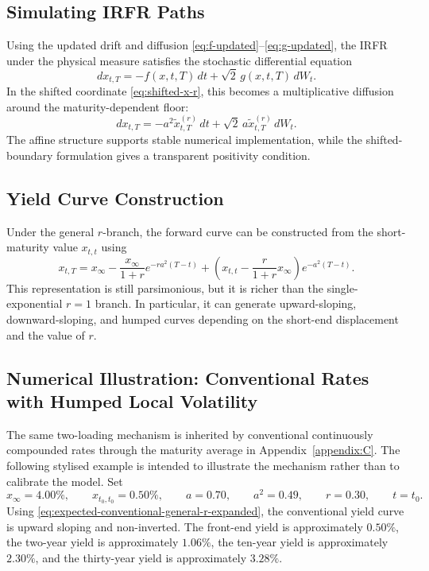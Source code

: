 \documentclass[12pt]{article}
\theoremstyle{statementstyle}
\begin{document}
\subsection{Simulating IRFR Paths}
\label{subsec:simulation}

Using the updated drift and diffusion
\eqref{eq:f-updated}--\eqref{eq:g-updated}, the IRFR under the physical
measure satisfies the stochastic differential equation
\[
dx_{t,T}
=
-f(x,t,T)\,dt
+
\sqrt{2}\,g(x,t,T)\,dW_{t}.
\]
In the shifted coordinate \eqref{eq:shifted-x-r}, this becomes a
multiplicative diffusion around the maturity-dependent floor:
\[
dx_{t,T}
=
-a^{2}\widetilde{x}_{t,T}^{(r)}\,dt
+
\sqrt{2}\,a\widetilde{x}_{t,T}^{(r)}\,dW_{t}.
\]
The affine structure supports stable numerical implementation, while the
shifted-boundary formulation gives a transparent positivity condition.

\subsection{Yield Curve Construction}
\label{subsec:yield-curve}

Under the general \(r\)-branch, the forward curve can be constructed
from the short-maturity value \(x_{t,t}\) using
\begin{equation}
x_{t,T}
=
x_{\infty}
-
\frac{x_{\infty}}{1+r}e^{-ra^{2}(T-t)}
+
\left(
x_{t,t}
-
\frac{r}{1+r}x_{\infty}
\right)e^{-a^{2}(T-t)}.
\tag{7.2.1}\label{eq:yield-curve-general-r}
\end{equation}
This representation is still parsimonious, but it is richer than the
single-exponential \(r=1\) branch. In particular, it can generate
upward-sloping, downward-sloping, and humped curves depending on the
short-end displacement and the value of \(r\).


\subsection{Numerical Illustration: Conventional Rates with Humped Local Volatility}
\label{subsec:conventional-rate-numerical-illustration}

The same two-loading mechanism is inherited by conventional continuously
compounded rates through the maturity average in Appendix~\ref{appendix:C}.
The following stylised example is intended to illustrate the mechanism rather
than to calibrate the model.  Set
\[
x_{\infty}=4.00\%,
\qquad
x_{t_{0},t_{0}}=0.50\%,
\qquad
a=0.70,
\qquad
a^{2}=0.49,
\qquad
r=0.30,
\qquad
t=t_{0}.
\]
Using \eqref{eq:expected-conventional-general-r-expanded}, the conventional
yield curve is upward sloping and non-inverted.  The front-end yield is
approximately \(0.50\%\), the two-year yield is approximately \(1.06\%\),
the ten-year yield is approximately \(2.30\%\), and the thirty-year yield is
approximately \(3.28\%\).
\end{document}
